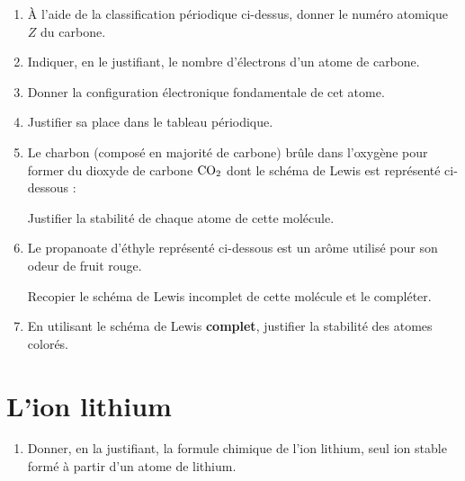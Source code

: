 \documentclass[12pt,a4paper]{article}
\begin{document}
\begin{enumerate}[resume]
\item À l'aide de la classification périodique ci-dessus, donner le numéro atomique $Z$ du carbone.

\item Indiquer, en le justifiant, le nombre d'électrons d'un atome de carbone.

\item Donner la configuration électronique fondamentale de cet atome.

\item Justifier sa place dans le tableau périodique.

\item Le charbon (composé en majorité de carbone) brûle dans l'oxygène pour former du dioxyde de carbone $\text{CO}_\text{2}$ dont le schéma de Lewis est représenté ci-dessous :
\begin{center}
\end{center}
Justifier la stabilité de chaque atome de cette molécule.

\item Le propanoate d'éthyle représenté ci-dessous est un arôme utilisé pour son odeur de fruit rouge.

\begin{center}
\end{center}

Recopier le schéma de Lewis incomplet de cette molécule et le compléter.

\item En utilisant le schéma de Lewis \textbf{complet}, justifier la stabilité des atomes colorés.

\end{enumerate}

\section*{L'ion lithium}

\begin{enumerate}[resume]
\item Donner, en la justifiant, la formule chimique de l'ion lithium, seul ion stable formé à partir d'un atome de lithium.
\end{enumerate}
\end{document}
